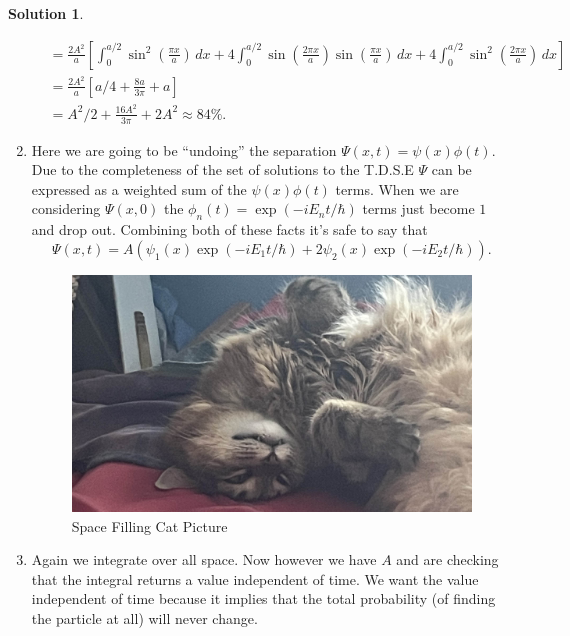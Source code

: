 \documentclass[10pt]{article}
\theoremstyle{definition}
\newtheorem{soln}{Solution}
\begin{document}
\begin{soln}
\begin{enumerate}[label=(\alph*)]
\begin{align*}
             & =\frac{2A^2}{a}\left[\int_{0}^{a/2}\sin^2\left(\frac{\pi x}{a}\right)\,dx +4\int_{0}^{a/2}\sin\left(\frac{2\pi x}{a}\right)\sin\left(\frac{\pi x}{a}\right)\,dx +4\int_{0}^{a/2}\sin^2\left(\frac{2\pi x}{a}\right)\,dx\right]                                                                                 \\
             & =\frac{2A^2}{a}\left[a/4 +\frac{8a}{3\pi} + a\right]                                                                                                                                                                                                                                                           \\
             & =A^2/2 +\frac{16A^2}{3\pi} + 2A^2\approx84\%.
          \end{align*}
    \item Here we are going to be ``undoing'' the separation $\Psi(x,t)=\psi(x)\phi(t)$. Due to the completeness of the
          set of solutions to the T.D.S.E $\Psi$ can be expressed as a weighted sum of the $\psi(x)\phi(t)$ terms. When we are considering
          $\Psi(x,0)$ the $\phi_n(t)=\exp(-iE_nt/\hbar)$ terms just become $1$ and drop out. Combining both of these facts it's safe to say that
          $$\Psi(x,t)=A(\psi_1(x)\exp(-iE_1t/\hbar)+2\psi_2(x)\exp(-iE_2t/\hbar)).$$
          \begin{figure}[ht]
            \centering
            \includegraphics[scale=0.5]{space filling cat.jpg}
            \caption{Space Filling Cat Picture}
          \end{figure}
          \newpage
    \item Again we integrate over all space. Now however we have $A$ and are checking that the integral returns a value independent of time.
          We want the value independent of time because it implies that the total probability (of finding the particle at all) will never change.

\end{enumerate}
\end{soln}
\end{document}
